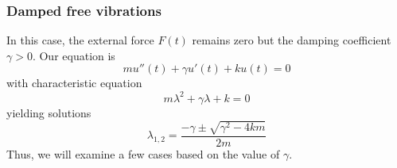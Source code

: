 \documentclass{article}
\begin{document}
\subsubsection{Damped free vibrations} \normalfont In this case, the external force $F(t)$ remains zero but the damping coefficient $\gamma > 0$. Our equation is 
\begin{equation*}
    mu''(t) + \gamma u'(t) + ku(t) = 0
\end{equation*}
with characteristic equation
\begin{equation*}
    m\lambda^2 + \gamma \lambda + k = 0
\end{equation*}
yielding solutions
\begin{equation*}
    \lambda_{1, 2} = \frac{-\gamma \pm \sqrt{\gamma^2 - 4km}}{2m}
\end{equation*}
Thus, we will examine a few cases based on the value of $\gamma$.
\end{document}
